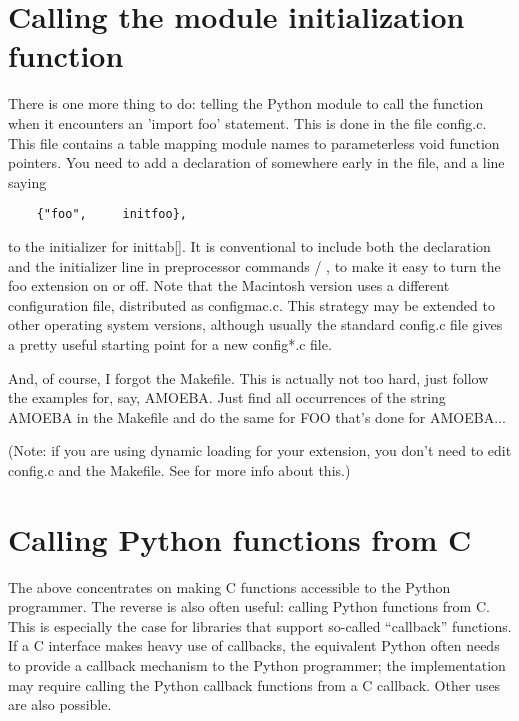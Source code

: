 \section{Calling the module initialization function}

There is one more thing to do: telling the Python module to call the
 function when it encounters an 'import foo' statement.
This is done in the file config.c.  This file contains a table mapping
module names to parameterless void function pointers.  You need to add
a declaration of  somewhere early in the file, and a
line saying

\begin{verbatim}
    {"foo",     initfoo},
\end{verbatim}

to the initializer for inittab[].  It is conventional to include both
the declaration and the initializer line in preprocessor commands
 / , to make it easy to turn the
foo extension on or off.  Note that the Macintosh version uses a
different configuration file, distributed as configmac.c.  This
strategy may be extended to other operating system versions, although
usually the standard config.c file gives a pretty useful starting
point for a new config*.c file.

And, of course, I forgot the Makefile.  This is actually not too hard,
just follow the examples for, say, AMOEBA.  Just find all occurrences
of the string AMOEBA in the Makefile and do the same for FOO that's
done for AMOEBA...

(Note: if you are using dynamic loading for your extension, you don't
need to edit config.c and the Makefile.  See  for more
info about this.)


\section{Calling Python functions from C}

The above concentrates on making C functions accessible to the Python
programmer.  The reverse is also often useful: calling Python
functions from C.  This is especially the case for libraries that
support so-called ``callback'' functions.  If a C interface makes heavy
use of callbacks, the equivalent Python often needs to provide a
callback mechanism to the Python programmer; the implementation may
require calling the Python callback functions from a C callback.
Other uses are also possible.

